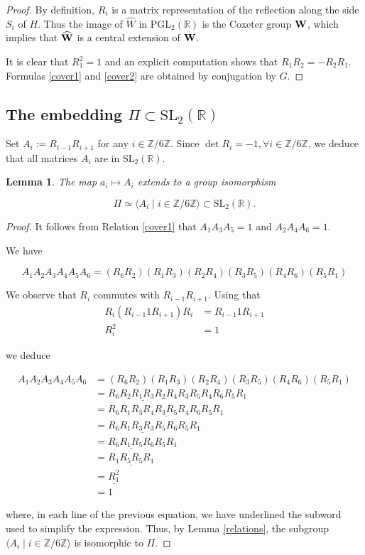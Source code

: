 \documentclass[10pt,a4paper]{amsart}
\newcommand{\R}{\mathbb{R}}
\newcommand{\Z}{\mathbb{Z}}
\newcommand{\PGL}{{\mathrm {PGL}}}
\newcommand{\SL}{{\mathrm {SL}}}
\newtheorem{lemma}{Lemma}
\begin{document}
\begin{proof} By definition, $R_i$ is a matrix representation of the reflection along
the side $S_i$ of $H$. Thus the image of $\widehat{W}$ in $\PGL_2(\R)$ is the Coxeter group 
$\bf {W}$, which implies that $\widehat{\bf W}$  is a central extension of
$\bf{W}$.

It is clear that $R_1^2=1$ and an explicit computation shows that 
$R_1R_2=-R_2R_1$. Formulas \ref{cover1} and \ref{cover2} are obtained by conjugation by $G$.
\end{proof}

\subsection{The embedding $\Pi\subset \SL_2(\R)$}

Set $A_i:=R_{i-1}R_{i+1}$ for any $i\in\Z/6\Z$. Since $\det R_i=-1, \forall i\in\Z/6\Z$,
we deduce that all matrices $A_i$ are in $\SL_2(\R)$.

\begin{lemma} The map $a_i\mapsto A_i$ extends to a group isomorphism

 $$\Pi\simeq \langle A_i\mid i\in\Z/6\Z\rangle\subset \SL_2(\R).$$
\end{lemma}

\begin{proof} It follows from Relation \ref{cover1} that 
$A_1A_3A_5=1$ and $A_2A_4A_6=1$.

We have 

$$A_1A_2A_3A_4A_5A_6=(R_6R_2)(R_1R_3)(R_2R_4)(R_3R_5)(R_4R_6)(R_5 R_1)$$

We observe that $R_i$ commutes with $R_{i-1}R_{i+1}$.
Using that 
\begin{align*}
R_i(R_{i-1}1R_{i+1})R_i&=R_{i-1}1R_{i+1}\\
R_i^2&=1
\end{align*}

 we deduce

\begin{align*}
A_1A_2A_3A_4A_5A_6&=(R_6R_2)(R_1R_3)(R_2R_4)(R_3R_5)(R_4R_6)(R_5 R_1)\\
&=R_6\underline{R_2R_1R_3R_2}R_4R_3R_5R_4R_6R_5 R_1\\
&=R_6R_1R_3\underline{R_4R_3R_5R_4}R_6R_5 R_1\\
&=R_6R_1\underline{R_3R_3}R_5R_6R_5 R_1 \\
&=\underline{R_6R_1R_5R_6}R_5 R_1\\
&=R_1\underline{R_5R_5} R_1\\
&=\underline{R_1^2}\\
&=1
\end{align*}

\noindent where, in each line of the previous equation, we have underlined the subword used to
simplify the expression. Thus, by Lemma \ref{relations}, 
the  subgroup $\langle A_i\mid i\in\Z/6\Z\rangle$ is isomorphic to
$\Pi$.
\end{proof}
\end{document}
